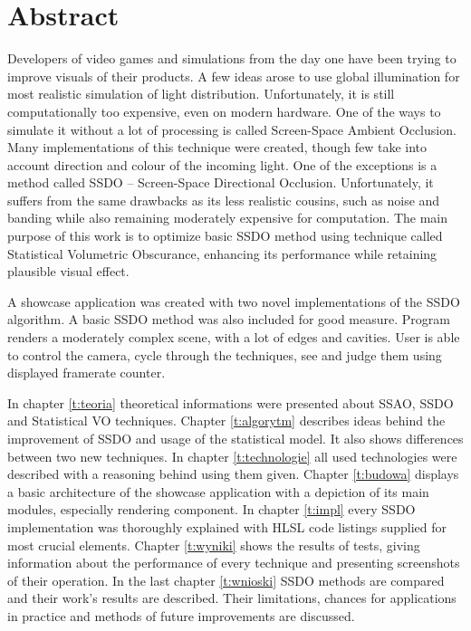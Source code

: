 \chapter*{Abstract}

Developers of video games and simulations from the day one have been trying to improve visuals of their products. A few ideas arose to use global illumination for most realistic simulation of light distribution. Unfortunately, it is still computationally too expensive, even on modern hardware. One of the ways to simulate it without a lot of processing is called Screen-Space Ambient Occlusion. Many implementations of this technique were created, though few take into account direction and colour of the incoming light. One of the exceptions is a method called SSDO -- Screen-Space Directional Occlusion. Unfortunately, it suffers from the same drawbacks as its less realistic cousins, such as noise and banding while also remaining moderately expensive for computation. The main purpose of this work is to optimize basic SSDO method using technique called Statistical Volumetric Obscurance, enhancing its performance while retaining plausible visual effect.

A showcase application was created with two novel implementations of the SSDO algorithm. A basic SSDO method was also included for good measure. Program renders a moderately complex scene, with a lot of edges and cavities. User is able to control the camera, cycle through the techniques, see and judge them using displayed framerate counter.

In chapter \ref{t:teoria} theoretical informations were presented about SSAO, SSDO and Statistical VO techniques. Chapter \ref{t:algorytm} describes ideas behind the improvement of SSDO and usage of the statistical model. It also shows differences between two new techniques. In chapter \ref{t:technologie} all used technologies were described with a reasoning behind using them given. Chapter \ref{t:budowa} displays a basic architecture of the showcase application with a depiction of its main modules, especially rendering component. In chapter \ref{t:impl} every SSDO implementation was thoroughly explained with HLSL code listings supplied for most crucial elements. Chapter \ref{t:wyniki} shows the results of tests, giving information about the performance of every technique and presenting screenshots of their operation. In the last chapter \ref{t:wnioski} SSDO methods are compared and their work's results are described. Their limitations, chances for applications in practice and methods of future improvements are discussed.